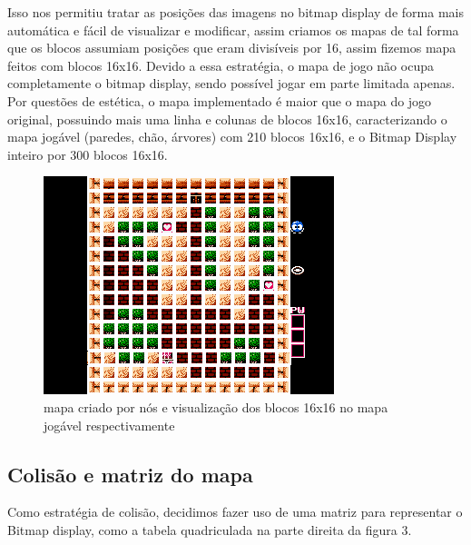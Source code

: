 \documentclass[10pt, conference, compsocconf]{IEEEtran}
\begin{document}
Isso nos permitiu tratar as posições das imagens no bitmap display de forma mais
automática e fácil de visualizar e modificar, assim criamos os mapas de tal
forma que os blocos assumiam posições que eram divisíveis por 16, assim fizemos
mapa feitos com blocos 16x16. Devido a essa estratégia, o mapa de jogo não ocupa
completamente o bitmap display, sendo possível jogar em parte limitada apenas.
Por questões de estética, o mapa implementado é maior que o mapa do jogo
original, possuindo mais uma linha e colunas de blocos 16x16, caracterizando o
mapa jogável (paredes, chão, árvores) com 210 blocos 16x16, e o Bitmap Display
inteiro por 300 blocos 16x16.

\begin{figure}[htb]
  \begin{center}
   \includegraphics[width=0.9\linewidth]{./Figures/image_6.png}
  \end{center}
  \caption{ mapa criado por nós e visualização dos
blocos 16x16 no mapa jogável respectivamente}
  \label{fig:01}
\end{figure}


\subsection{Colisão e matriz do mapa}{
\label{sec:Mars}
Como estratégia de colisão, decidimos fazer uso de
uma matriz para representar o Bitmap display, como
a tabela quadriculada na parte direita da figura 3.

}
\end{document}
